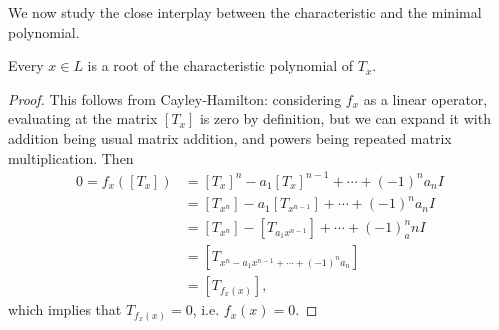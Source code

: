 We now study the close interplay between the characteristic and the minimal polynomial.

\begin{prop}
	Every $x \in L$ is a root of the characteristic polynomial of $T_x$.
\end{prop}
\begin{proof}
	This follows from Cayley-Hamilton: considering $f_x$ as a linear operator, evaluating at the matrix $[T_x]$ is zero by definition, but we can expand it with addition being usual matrix addition, and powers being repeated matrix multiplication. Then
	\begin{align*}
		0 = f_x([T_x]) &= [T_x]^n - a_1[T_x]^{n-1} + \cdots + (-1)^na_n I\\
			&= [T_{x^n}] - a_1[T_{x^{n-1}}] + \cdots + (-1)^na_n I\\
			&= [T_{x^n}] - [T_{a_1x^{n-1}}] + \cdots + (-1)^n_an I\\
			&= [T_{x^n-a_1x^{n-1} + \cdots + (-1)^na_n}]\\
			&= [T_{f_x(x)}],
	\end{align*}
	which implies that $T_{f_x(x)}=0$, i.e. $f_x(x)=0$.
\end{proof}

